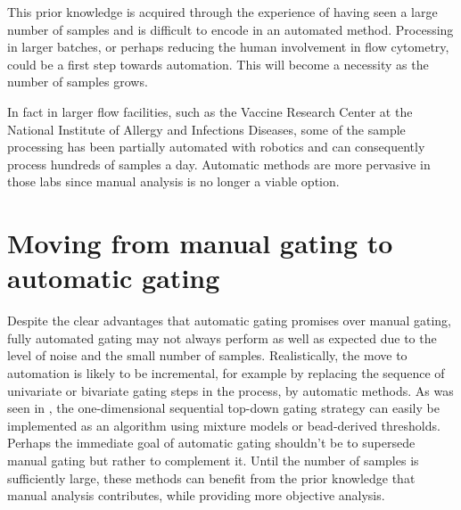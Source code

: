 This prior knowledge is acquired through the experience of having seen a large number of samples and is difficult to encode in an automated method.
Processing in larger batches, or perhaps reducing the human involvement in flow cytometry, could be a first step towards automation.
This will become a necessity as the number of samples grows.

In fact in larger flow facilities, such as the Vaccine Research Center at the National Institute of Allergy and Infections Diseases, some of the sample processing has been partially automated with robotics and can consequently process hundreds of samples a day.
Automatic methods are more pervasive in those labs since manual analysis is no longer a viable option.


\section{ Moving from manual gating to automatic gating }

Despite the clear advantages that automatic gating promises over manual gating, fully automated gating may not always perform as well as expected due to the level of noise and the small number of samples.
Realistically, the move to automation is likely to be incremental, for example by replacing the sequence of univariate or bivariate gating steps in the process, by automatic methods.
As was seen in , the one-dimensional sequential top-down gating strategy can easily be implemented as an algorithm using mixture models or bead-derived thresholds.  
Perhaps the immediate goal of automatic gating shouldn't be to supersede manual gating but rather to complement it.
Until the number of samples is sufficiently large, these methods can benefit from the prior knowledge that manual analysis contributes, while providing more objective analysis.

